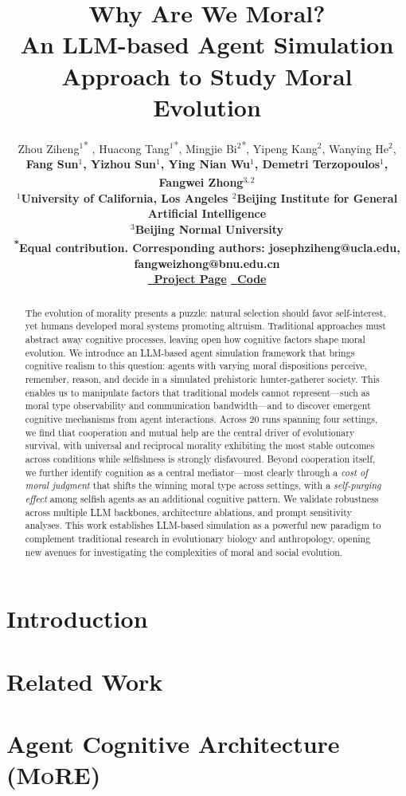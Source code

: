 \documentclass[11pt]{article}
\title{Why Are We Moral? \\ An LLM-based Agent Simulation Approach to Study Moral Evolution}
\author{
Zhou Ziheng$^{1}$\textsuperscript{* \Letter},
Huacong Tang$^{1}$\textsuperscript{*},
Mingjie Bi$^{2}$\textsuperscript{*},
Yipeng Kang$^{2}$,
Wanying He$^{2}$, \\
\bf
Fang Sun$^{1}$,
Yizhou Sun$^{1}$,
Ying Nian Wu$^{1}$,
Demetri Terzopoulos$^{1}$,
Fangwei Zhong$^{3,2}$\textsuperscript{\Letter}
\\[0.3em]
$^{1}$University of California, Los Angeles  \quad
$^{2}$Beijing Institute for General Artificial Intelligence \quad \\
$^{3}$Beijing Normal University 
\\
\textsuperscript{*}Equal contribution.\quad
\textsuperscript{\Letter}Corresponding authors: josephziheng@ucla.edu, fangweizhong@bnu.edu.cn
\\[0.5em]
\href{https://MoralAgentSim.github.io}{\faGlobe~Project Page} \quad
\href{https://github.com/MoralAgentSim/Simulation-Engine}{\faGithub~Code}
}
\newcommand{\agentframe}{\textsc{MoRE}\xspace}
\begin{document}
\maketitle
\begin{abstract}
The evolution of morality presents a puzzle: natural selection should favor self-interest, yet humans developed moral systems promoting altruism. Traditional approaches must abstract away cognitive processes, leaving open how cognitive factors shape moral evolution. We introduce an LLM-based agent simulation framework that brings cognitive realism to this question: agents with varying moral dispositions perceive, remember, reason, and decide in a simulated prehistoric hunter-gatherer society. This enables us to manipulate factors that traditional models cannot represent---such as moral type observability and communication bandwidth---and to discover emergent cognitive mechanisms from agent interactions. Across 20 runs spanning four settings, we find that cooperation and mutual help are the central driver of evolutionary survival, with universal and reciprocal morality exhibiting the most stable outcomes across conditions while selfishness is strongly disfavoured. Beyond cooperation itself, we further identify cognition as a central mediator---most clearly through a \emph{cost of moral judgment} that shifts the winning moral type across settings, with a \emph{self-purging effect} among selfish agents as an additional cognitive pattern. We validate robustness across multiple LLM backbones, architecture ablations, and prompt sensitivity analyses. This work establishes LLM-based simulation as a powerful new paradigm to complement traditional research in evolutionary biology and anthropology, opening new avenues for investigating the complexities of moral and social evolution.
\end{abstract}

\section{Introduction}
\label{sec:introduction}


\section{Related Work}
\label{sec:related_work}


\section{Agent Cognitive Architecture (\agentframe)}
\label{sec:agent_architecture}

\end{document}
